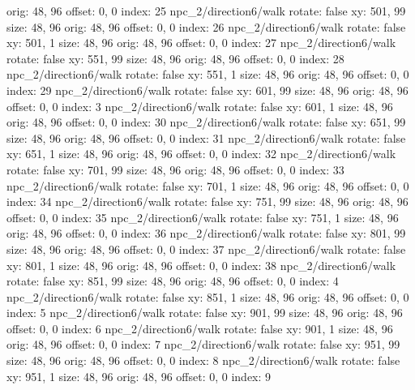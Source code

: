   orig: 48, 96
  offset: 0, 0
  index: 25
npc_2/direction6/walk
  rotate: false
  xy: 501, 99
  size: 48, 96
  orig: 48, 96
  offset: 0, 0
  index: 26
npc_2/direction6/walk
  rotate: false
  xy: 501, 1
  size: 48, 96
  orig: 48, 96
  offset: 0, 0
  index: 27
npc_2/direction6/walk
  rotate: false
  xy: 551, 99
  size: 48, 96
  orig: 48, 96
  offset: 0, 0
  index: 28
npc_2/direction6/walk
  rotate: false
  xy: 551, 1
  size: 48, 96
  orig: 48, 96
  offset: 0, 0
  index: 29
npc_2/direction6/walk
  rotate: false
  xy: 601, 99
  size: 48, 96
  orig: 48, 96
  offset: 0, 0
  index: 3
npc_2/direction6/walk
  rotate: false
  xy: 601, 1
  size: 48, 96
  orig: 48, 96
  offset: 0, 0
  index: 30
npc_2/direction6/walk
  rotate: false
  xy: 651, 99
  size: 48, 96
  orig: 48, 96
  offset: 0, 0
  index: 31
npc_2/direction6/walk
  rotate: false
  xy: 651, 1
  size: 48, 96
  orig: 48, 96
  offset: 0, 0
  index: 32
npc_2/direction6/walk
  rotate: false
  xy: 701, 99
  size: 48, 96
  orig: 48, 96
  offset: 0, 0
  index: 33
npc_2/direction6/walk
  rotate: false
  xy: 701, 1
  size: 48, 96
  orig: 48, 96
  offset: 0, 0
  index: 34
npc_2/direction6/walk
  rotate: false
  xy: 751, 99
  size: 48, 96
  orig: 48, 96
  offset: 0, 0
  index: 35
npc_2/direction6/walk
  rotate: false
  xy: 751, 1
  size: 48, 96
  orig: 48, 96
  offset: 0, 0
  index: 36
npc_2/direction6/walk
  rotate: false
  xy: 801, 99
  size: 48, 96
  orig: 48, 96
  offset: 0, 0
  index: 37
npc_2/direction6/walk
  rotate: false
  xy: 801, 1
  size: 48, 96
  orig: 48, 96
  offset: 0, 0
  index: 38
npc_2/direction6/walk
  rotate: false
  xy: 851, 99
  size: 48, 96
  orig: 48, 96
  offset: 0, 0
  index: 4
npc_2/direction6/walk
  rotate: false
  xy: 851, 1
  size: 48, 96
  orig: 48, 96
  offset: 0, 0
  index: 5
npc_2/direction6/walk
  rotate: false
  xy: 901, 99
  size: 48, 96
  orig: 48, 96
  offset: 0, 0
  index: 6
npc_2/direction6/walk
  rotate: false
  xy: 901, 1
  size: 48, 96
  orig: 48, 96
  offset: 0, 0
  index: 7
npc_2/direction6/walk
  rotate: false
  xy: 951, 99
  size: 48, 96
  orig: 48, 96
  offset: 0, 0
  index: 8
npc_2/direction6/walk
  rotate: false
  xy: 951, 1
  size: 48, 96
  orig: 48, 96
  offset: 0, 0
  index: 9

